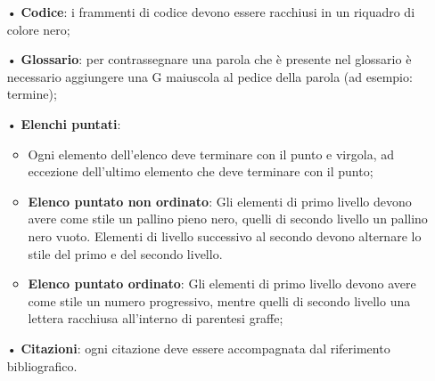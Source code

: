 \begin{itemize}
\item[•] \textbf{Codice}: i frammenti di codice devono essere racchiusi in un riquadro di colore nero;
\item[•] \textbf{Glossario}: per contrassegnare una parola che è presente nel glossario è necessario aggiungere una G maiuscola al pedice della parola (ad esempio: {termine});
\item[•] \textbf{Elenchi puntati}:
\begin{itemize}
	\item Ogni elemento dell'elenco deve terminare con il punto e virgola, ad eccezione dell'ultimo elemento che deve terminare con il punto;
	\item \textbf{Elenco puntato non ordinato}:
	Gli elementi di primo livello devono avere come stile un pallino pieno nero, quelli di secondo livello un pallino nero vuoto. Elementi di livello successivo al secondo devono alternare lo stile del primo e del secondo livello.
	\item \textbf{Elenco puntato ordinato}:
	Gli elementi di primo livello devono avere come stile un numero progressivo, mentre quelli di secondo livello una lettera racchiusa all'interno di parentesi graffe;
	\end{itemize}
	\item[•] \textbf{Citazioni}: ogni citazione deve essere accompagnata dal riferimento bibliografico.
\end{itemize}

